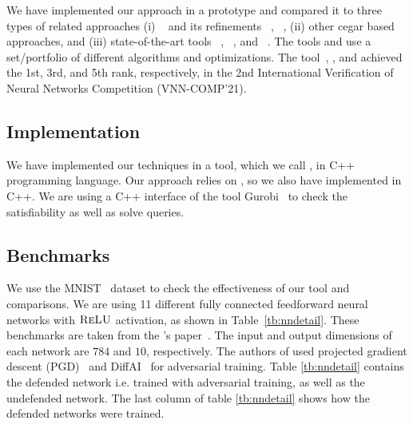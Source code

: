 We have implemented our approach in a prototype and compared it to three types of related approaches 
(i) \deeppoly{}~\cite{singh2019abstract} and its refinements \kpoly{}~\cite{singh2019beyond}, \deepsrgr{}~\cite{yang2021improving}, 
(ii) other cegar based approaches, and 
(iii) state-of-the-art tools \alphabeta~\cite{zhang2018efficient,wang2021beta,xu2020fast,zhang2022branch,tjeng2017evaluating}, 
\ovaltool~\cite{bunel2018unified,bunel2020branch,bunel2020lagrangian,de2021scaling,de2021scaling,de2021scaling2,de2021improved}, 
and \marabou~\cite{katz2019marabou}. 
The tools \alphabeta{} and \ovaltool{} use a set/portfolio of different algorithms and optimizations. 
The tool~\alphabeta{}, \ovaltool{}, and \marabou{} achieved the 1st, 3rd, and 5th rank, 
respectively, 
in the 2nd International Verification of Neural Networks Competition (VNN-COMP'21).
\subsection{Implementation}
We have implemented our techniques in a tool, which we call \drefine{}, in \textsc{C++} programming language. Our approach relies on \deeppoly{}, so we also have implemented \deeppoly{} in \textsc{C++}. We are using a \textsc{C++} interface of the tool Gurobi~\cite{gurobioptimizer} to check the satisfiability as well as solve  \maxsat{} queries. %

\subsection{Benchmarks}
We use the MNIST~\cite{deng2012mnist} dataset to check the effectiveness of our tool and comparisons. We are using 11 different fully connected feedforward neural networks with $\textsc{ReLU}${} activation, as shown in Table~\ref{tb:nndetail}.
These benchmarks are taken from the \deeppoly{}'s paper~\cite{singh2019abstract}.  The input and output dimensions of each network are $784$ and $10$, respectively. 
The authors of \deeppoly{} used projected gradient descent (PGD)~\cite{dong2018boosting}
and DiffAI~\cite{mirman2018differentiable} for adversarial training. Table \ref{tb:nndetail} contains the defended network i.e.
trained with adversarial training, as well as the undefended network. The last column of table \ref{tb:nndetail} shows how the defended networks were trained.  


